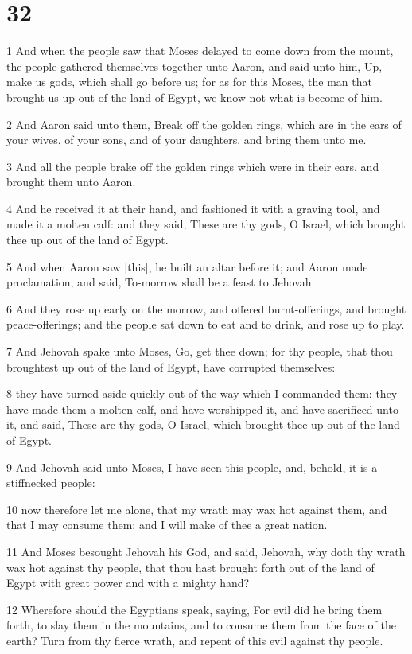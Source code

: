 \chapter{32}

\par 1 And when the people saw that Moses delayed to come down from the mount, the people gathered themselves together unto Aaron, and said unto him, Up, make us gods, which shall go before us; for as for this Moses, the man that brought us up out of the land of Egypt, we know not what is become of him.
\par 2 And Aaron said unto them, Break off the golden rings, which are in the ears of your wives, of your sons, and of your daughters, and bring them unto me.
\par 3 And all the people brake off the golden rings which were in their ears, and brought them unto Aaron.
\par 4 And he received it at their hand, and fashioned it with a graving tool, and made it a molten calf: and they said, These are thy gods, O Israel, which brought thee up out of the land of Egypt.
\par 5 And when Aaron saw [this], he built an altar before it; and Aaron made proclamation, and said, To-morrow shall be a feast to Jehovah.
\par 6 And they rose up early on the morrow, and offered burnt-offerings, and brought peace-offerings; and the people sat down to eat and to drink, and rose up to play.
\par 7 And Jehovah spake unto Moses, Go, get thee down; for thy people, that thou broughtest up out of the land of Egypt, have corrupted themselves:
\par 8 they have turned aside quickly out of the way which I commanded them: they have made them a molten calf, and have worshipped it, and have sacrificed unto it, and said, These are thy gods, O Israel, which brought thee up out of the land of Egypt.
\par 9 And Jehovah said unto Moses, I have seen this people, and, behold, it is a stiffnecked people:
\par 10 now therefore let me alone, that my wrath may wax hot against them, and that I may consume them: and I will make of thee a great nation.
\par 11 And Moses besought Jehovah his God, and said, Jehovah, why doth thy wrath wax hot against thy people, that thou hast brought forth out of the land of Egypt with great power and with a mighty hand?
\par 12 Wherefore should the Egyptians speak, saying, For evil did he bring them forth, to slay them in the mountains, and to consume them from the face of the earth? Turn from thy fierce wrath, and repent of this evil against thy people.
